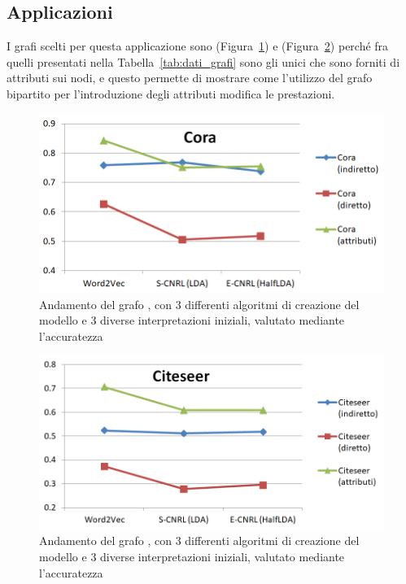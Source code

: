 \subsection{Applicazioni}
I grafi scelti per questa applicazione sono \cora (Figura~\ref{fig:VC_cora}) e \citeseer (Figura~\ref{fig:VC_citeseer}) perché fra quelli presentati nella Tabella~\ref{tab:dati_grafi} sono gli unici che sono forniti di attributi sui nodi, e questo permette di mostrare come l'utilizzo del grafo bipartito per l'introduzione degli attributi modifica le prestazioni.
%
\begin{figure}[htp]
	\centering
	\includegraphics[width=\linewidth]{immagini/VC_cora}
	\caption{Andamento del grafo \cora, con 3 differenti algoritmi di creazione del modello e 3 diverse interpretazioni iniziali, valutato mediante l'accuratezza}
	\label{fig:VC_cora}
\end{figure}
%
\begin{figure}[htp]
	\centering
	\includegraphics[width=\linewidth]{immagini/VC_citeseer}
	\caption{Andamento del grafo \citeseer, con 3 differenti algoritmi di creazione del modello e 3 diverse interpretazioni iniziali, valutato mediante l'accuratezza}
	\label{fig:VC_citeseer}
\end{figure}
